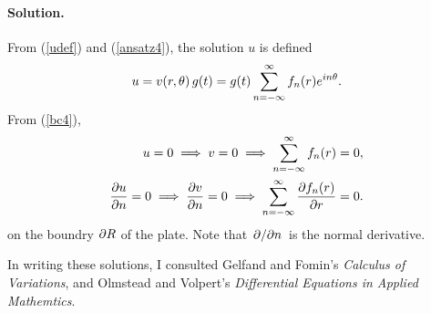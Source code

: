 \documentclass[11pt]{article}
\newcommand{\refeq}[1]{(\ref{#1})}
\newcommand{\beq}{\begin{equation*}}
\newcommand{\eeq}{\end{equation*}}
\newcommand{\beqn}{\begin{equation}}
\newcommand{\eeqn}{\end{equation}}
\newenvironment{solution}
{
    \paragraph{Solution.}
    \ignorespaces
}
{
}
\begin{document}
\begin{solution}
	From \refeq{udef} and \refeq{ansatz4}, the solution $u$ is defined
	\beq
		u = \vrt \,\gt = \gt \sum_{n = -\infty}^\infty \fnr e^{i n \theta}.
	\eeq
	From \refeq{bc4},
	\begin{align}
		u = 0 \implies v = 0 \implies \sum_{n = -\infty}^\infty f_n(r) = 0, \\
		\pdv{u}{n} = 0 \implies \pdv{v}{n} = 0 \implies \sum_{n = -\infty}^\infty \pdv{f_n(r)}{r} = 0.
	\end{align}
	on the boundry $\partial R$ of the plate.  Note that $\pdv*{}{n}$ is the normal derivative.  %
	
%	
%	
%
\end{solution}



In writing these solutions, I consulted Gelfand and Fomin's \emph{Calculus of Variations}, and Olmstead and Volpert's \emph{Differential Equations in Applied Mathemtics}.
\end{document}
